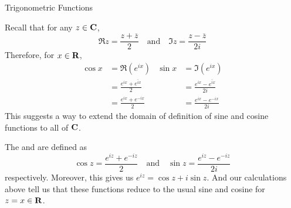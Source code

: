 \vspace*{2em}

\begin{mdframed}
\begin{center}
{\Large Trigonometric Functions}
\end{center}
\end{mdframed}

\begin{discussion}
Recall that for any $z \in \mathbf C$,
\[\Re z = \frac{z + \overline{z}}{2} \quad \text{and} \quad \Im z = \frac{z - \overline{z}}{2i}\]
Therefore, for $x \in \mathbf R$,
\begin{align*}
\cos x &= \Re(e^{ix}) & \sin x &= \Im(e^{ix})\\[0.5em]
 &= \frac{e^{ix} + \overline{e^{ix}}}{2} & &= \frac{e^{ix} - \overline{e^{ix}}}{2i}\\[0.5em]
 &= \frac{e^{ix} + e^{-ix}}{2} & &= \frac{e^{ix} - e^{-ix}}{2i}
\end{align*}
This suggests a way to extend the domain of definition of sine and cosine functions to all of $\mathbf C$.
\end{discussion}


\begin{definition}
The  and  are defined as
\[\cos z = \frac{e^{iz} + e^{-iz}}{2} \quad \text{and} \quad \sin z = \frac{e^{iz} - e^{-iz}}{2i}\]
respectively. Moreover, this gives us $e^{iz} = \cos z + i\sin z$. And our calculations above tell us that these functions reduce to the usual sine and cosine for $z = x \in \mathbf R$.
\end{definition}

\vspace*{1em}

